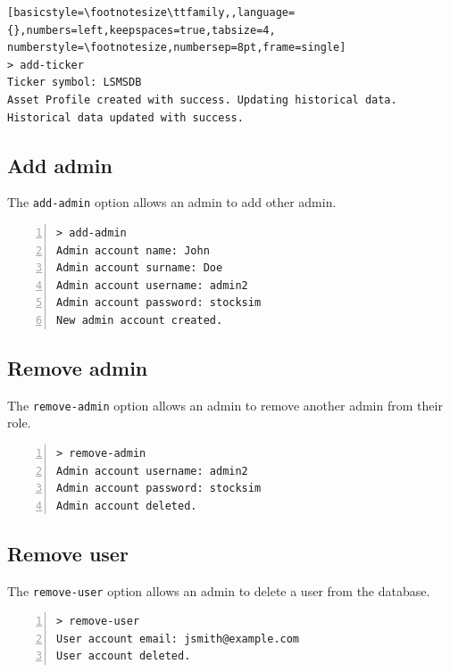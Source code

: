 \begin{lstlisting}[basicstyle=\footnotesize\ttfamily,,language={},numbers=left,keepspaces=true,tabsize=4,
numberstyle=\footnotesize,numbersep=8pt,frame=single]
> add-ticker
Ticker symbol: LSMSDB
Asset Profile created with success. Updating historical data.
Historical data updated with success.
\end{lstlisting}

\subsection{Add admin}
The \texttt{add-admin} option allows an admin to add other admin.
\begin{lstlisting}[basicstyle=\footnotesize\ttfamily,language={},numbers=left,keepspaces=true,tabsize=4,
numberstyle=\footnotesize,numbersep=8pt,frame=single]
> add-admin
Admin account name: John
Admin account surname: Doe
Admin account username: admin2
Admin account password: stocksim
New admin account created.
\end{lstlisting}

\subsection{Remove admin}

The \texttt{remove-admin} option allows an admin to remove another admin from their role.

\begin{lstlisting}[basicstyle=\footnotesize\ttfamily,language={},numbers=left,keepspaces=true,tabsize=4,
numberstyle=\footnotesize,numbersep=8pt,frame=single]
> remove-admin
Admin account username: admin2
Admin account password: stocksim
Admin account deleted.
\end{lstlisting}

\subsection{Remove user}
The \texttt{remove-user} option allows an admin to delete a user from the database.

\begin{lstlisting}[basicstyle=\footnotesize\ttfamily,language={},numbers=left,keepspaces=true,tabsize=4,
numberstyle=\footnotesize,numbersep=8pt,frame=single]
> remove-user
User account email: jsmith@example.com
User account deleted.
\end{lstlisting}


